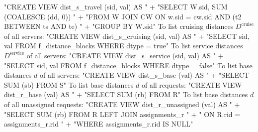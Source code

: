 "CREATE VIEW dist_s_travel (sid, val) AS "
  + "SELECT W.sid, SUM (COALESCE (dd, 0)) "
  + "FROM W JOIN CW ON w.sid = cw.sid AND (t2 BETWEEN ts AND te) "
  + "GROUP BY W.sid"
\nwendcode{}\nwdocspar
To list cruising distances $D^\textrm{cruise}$ of all servers:
\nwenddocs{}\endmoddef{}
"CREATE VIEW dist_s_cruising (sid, val) AS "
  + "SELECT sid, val FROM f_distance_blocks WHERE dtype = true"
\nwendcode{}\nwdocspar
To list service distances $D^\textrm{service}$ of all servers:
\nwenddocs{}\endmoddef{}
"CREATE VIEW dist_s_service (sid, val) AS "
  + "SELECT sid, val FROM f_distance_blocks WHERE dtype = false"
\nwendcode{}\nwdocspar
To list base distances $d$ of all servers:
\nwenddocs{}\endmoddef{}
"CREATE VIEW dist_s_base (val) AS "
  + "SELECT SUM (sb) FROM S"
\nwendcode{}\nwdocspar
To list base distances $d$ of all requests:
\nwenddocs{}\endmoddef{}
"CREATE VIEW dist_r_base (val) AS "
  + "SELECT SUM (rb) FROM R"
\nwendcode{}\nwdocspar
To list base distances $d$ of all unassigned requests:
\nwenddocs{}\endmoddef{}
"CREATE VIEW dist_r_unassigned (val) AS "
  + "SELECT SUM (rb) FROM R LEFT JOIN assignments_r "
  + "  ON R.rid = assignments_r.rid "
  + "WHERE assignments_r.rid IS NULL"
\nwendcode{}

